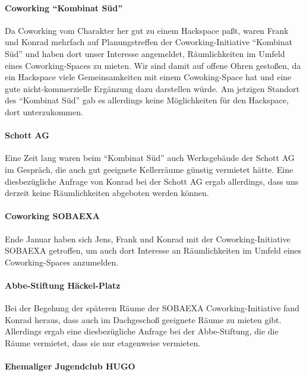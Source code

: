 \documentclass[10pt,DIV16]{scrartcl}
\begin{document}
\paragraph{Coworking ``Kombinat Süd''}

Da Coworking vom Charakter her gut zu einem Hackspace paßt, waren Frank und
Konrad mehrfach auf Planungstreffen der Coworking-Initiative "`Kombinat Süd"'
und haben dort unser Interesse angemeldet, Räumlichkeiten im Umfeld eines
Coworking-Spaces zu mieten.  Wir sind damit auf offene Ohren gestoßen, da ein
Hackspace viele Gemeinsamkeiten mit einem Cowoking-Space hat und eine gute
nicht-kommerzielle Ergänzung dazu darstellen würde.  Am jetzigen Standort des
"`Kombinat Süd"' gab es allerdings keine Möglichkeiten für den Hackspace, dort
unterzukommen.

\paragraph{Schott AG}

Eine Zeit lang waren beim "`Kombinat Süd"' auch Werksgebäude der Schott AG im
Gespräch, die auch gut geeignete Kellerräume günstig vermietet hätte.  Eine
diesbezügliche Anfrage von Konrad bei der Schott AG ergab allerdings, dass uns
derzeit keine Räumlichkeiten abgeboten werden können.

\paragraph{Coworking SOBAEXA}

Ende Januar haben sich Jens, Frank und Konrad mit der Coworking-Initiative
SOBAEXA getroffen, um auch dort Interesse an Räumlichkeiten im Umfeld eines
Coworking-Spaces anzumelden.

\paragraph{Abbe-Stiftung Häckel-Platz}

Bei der Begehung der späteren Räume der SOBAEXA Coworking-Initiative fand
Konrad heraus, dass auch im Dachgeschoß geeignete Räume zu mieten gibt.
Allerdings ergab eine diesbezügliche Anfrage bei der Abbe-Stiftung, die die
Räume vermietet, dass sie nur etagenweise vermieten.

\paragraph{Ehemaliger Jugendclub HUGO}
\end{document}
